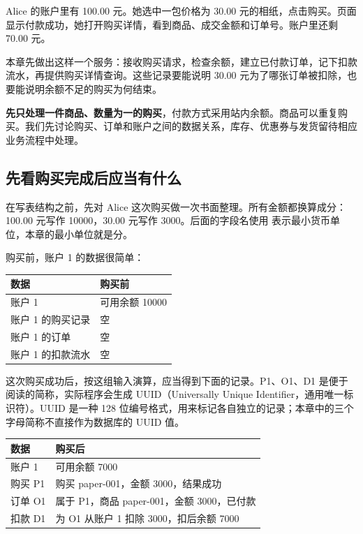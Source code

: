 Alice 的账户里有 100.00 元。她选中一包价格为 30.00 元的相纸，点击购买。页面显示付款成功，她打开购买详情，看到商品、成交金额和订单号。账户里还剩 70.00 元。

本章先做出这样一个服务：接收购买请求，检查余额，建立已付款订单，记下扣款流水，再提供购买详情查询。这些记录要能说明 30.00 元为了哪张订单被扣除，也要能说明余额不足的购买为何结束。

\textbf{先只处理一件商品、数量为一的购买}，付款方式采用站内余额。商品可以重复购买。我们先讨论购买、订单和账户之间的数据关系，库存、优惠券与发货留待相应业务流程中处理。

\subsection*{先看购买完成后应当有什么}

在写表结构之前，先对 Alice 这次购买做一次书面整理。所有金额都换算成分：100.00 元写作 10000，30.00 元写作 3000。后面的字段名使用  表示最小货币单位，本章的最小单位就是分。

购买前，账户 1 的数据很简单：

\begin{center}
\begin{minipage}{\linewidth}
\centering\small\captionsetup{hypcap=false}
\begin{tabularx}{\linewidth}{p{.26\linewidth}X}
\toprule
\textbf{数据} & \textbf{购买前} \\
\midrule
账户 1 & 可用余额 10000 \\
账户 1 的购买记录 & 空 \\
账户 1 的订单 & 空 \\
账户 1 的扣款流水 & 空 \\
\bottomrule
\end{tabularx}
\end{minipage}
\end{center}

这次购买成功后，按这组输入演算，应当得到下面的记录。P1、O1、D1 是便于阅读的简称，实际程序会生成 UUID（Universally Unique Identifier，通用唯一标识符）。UUID 是一种 128 位编号格式，用来标记各自独立的记录；本章中的三个字母简称不直接作为数据库的 UUID 值。

\begin{center}
\begin{minipage}{\linewidth}
\centering\small\captionsetup{hypcap=false}
\begin{tabularx}{\linewidth}{p{.26\linewidth}X}
\toprule
\textbf{数据} & \textbf{购买后} \\
\midrule
账户 1 & 可用余额 7000 \\
购买 P1 & 购买 paper-001，金额 3000，结果成功 \\
订单 O1 & 属于 P1，商品 paper-001，金额 3000，已付款 \\
扣款 D1 & 为 O1 从账户 1 扣除 3000，扣后余额 7000 \\
\bottomrule
\end{tabularx}
\end{minipage}
\end{center}

